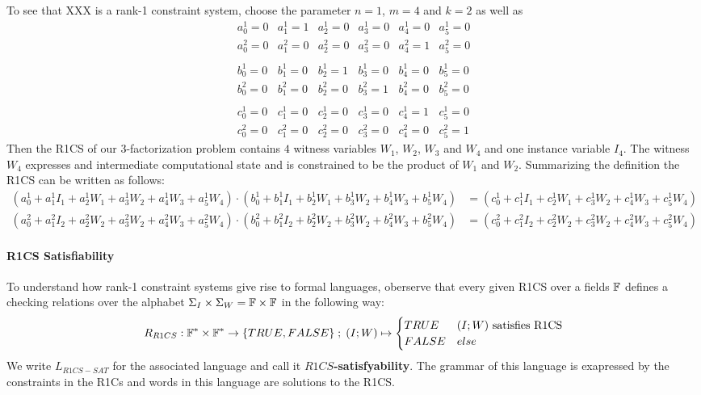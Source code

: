 \begin{example}[3-Factorization]
To see that XXX is a rank-1 constraint system, choose the parameter $n=1$, $m=4$ and $k=2$ as well as
$$
\begin{array}{llllll}
a_0^1 = 0 & a_1^1= 1 & a_2^1= 0 & a_3^1 = 0 & a_4^1= 0  & a_5^1= 0 \\ 
a_0^2 = 0 & a_1^2= 0 & a_2^2= 0 & a_3^2 = 0 & a_4^2= 1  & a_5^2= 0 \\ 
\\
b_0^1 = 0 & b_1^1= 0 & b_2^1= 1 & b_3^1 = 0 & b_4^1= 0  & b_5^1= 0 \\ 
b_0^2 = 0 & b_1^2= 0 & b_2^2= 0 & b_3^2 = 1 & b_4^2= 0  & b_5^2= 0 \\ 
\\
c_0^1 = 0 & c_1^1= 0 & c_2^1= 0 & c_3^1 = 0 & c_4^1= 1  & c_5^1= 0 \\ 
c_0^2 = 0 & c_1^2= 0 & c_2^2= 0 & c_3^2 = 0 & c_4^2= 0  & c_5^2= 1 
\end{array} 
$$
Then the R1CS of our $3$-factorization problem contains $4$ witness variables $W_1$, $W_2$, $W_3$ and $W_4$ and one instance variable $I_4$. The witness $W_4$ expresses and intermediate computational state and is constrained to be the product of $W_1$ and $W_2$. Summarizing the definition the R1CS  can be written as follows:
\begin{align*}
\scriptstyle
\left(a^1_0 + a_1^1 I_1 + a_2^1 W_1 + a_3^1 W_2 + a_4^1 W_3 + a_5^1 W_4\right)\cdot
\left(b^1_0 + b_1^1 I_1 + b_2^1 W_1 + b_3^1 W_2 + b_4^1 W_3 + b_5^1 W_4\right) &=
\scriptstyle
\left(c^1_0 + c_1^1 I_1 + c_2^1 W_1 + c_3^1 W_2 + c_4^1 W_3 + c_5^1 W_4\right)\\
\scriptstyle
\left(a^2_0 + a_1^2 I_2 + a_2^2 W_2 + a_3^2 W_2 + a_4^2 W_3 + a_5^2 W_4\right)\cdot
\left(b^2_0 + b_1^2 I_2 + b_2^2 W_2 + b_3^2 W_2 + b_4^2 W_3 + b_5^2 W_4\right) &=
\scriptstyle
\left(c^2_0 + c_1^2 I_2 + c_2^2 W_2 + c_3^2 W_2 + c_4^2 W_3 + c_5^2 W_4\right)
\end{align*}
\end{example}

\paragraph{R1CS Satisfiability}To understand how rank-1 constraint systems give rise to formal languages, oberserve that every given R1CS over a fields $\mathbb{F}$ defines a checking relations over the alphabet $\Sigma_I \times \Sigma_W = \mathbb{F} \times \mathbb{F}$ in the following way:
\begin{equation}
R_{R1CS} : \mathbb{F}^* \times \mathbb{F}^* \to \{TRUE, FALSE\}\;;\;
(I;W) \mapsto
\begin{cases}
TRUE & (I;W) \text{ satisfies R1CS}\\
FALSE & else
\end{cases}
\end{equation}
We write $L_{R1CS-SAT}$ for the associated language and call it \textbf{$R1CS$-satisfyability}. The grammar of this language is exapressed by the constraints in the R1Cs and words in this language are solutions to the R1CS. 

